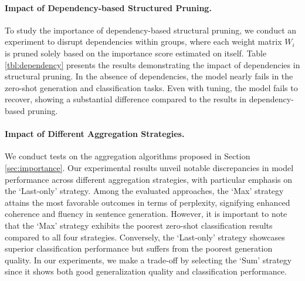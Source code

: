 \documentclass{article}
\begin{document}

\paragraph{Impact of Dependency-based Structured Pruning.} \label{exp:dependency}
To study the importance of dependency-based structural pruning, we conduct an experiment to disrupt dependencies within groups, where each weight matrix $W_i$ is pruned solely based on the importance score estimated on itself. Table \ref{tbl:dependency} presents the results demonstrating the impact of dependencies in structural pruning. In the absence of dependencies, the model nearly fails in the zero-shot generation and classification tasks. Even with tuning, the model fails to recover, showing a substantial difference compared to the results in dependency-based pruning.

\paragraph{Impact of Different Aggregation Strategies.}

We conduct tests on the aggregation algorithms proposed in Section \ref{sec:importance}. Our experimental results unveil notable discrepancies in model performance across different aggregation strategies, with particular emphasis on the `Last-only' strategy. Among the evaluated approaches, the `Max' strategy attains the most favorable outcomes in terms of perplexity, signifying enhanced coherence and fluency in sentence generation. However, it is important to note that the `Max' strategy exhibits the poorest zero-shot classification results compared to all four strategies. Conversely, the `Last-only' strategy showcases superior classification performance but suffers from the poorest generation quality.
In our experiments, we make a trade-off by selecting the `Sum' strategy since it shows both good generalization quality and classification performance.
\end{document}
